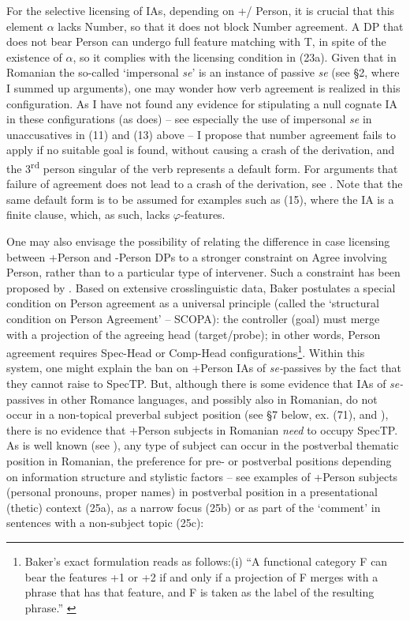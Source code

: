 \documentclass[output=paper]{langsci/langscibook}
\begin{document}
For the selective licensing of IAs, depending on +/\textminus{} Person, it is crucial that this element $\alpha $ lacks Number, so that it does not block Number agreement. A DP that does not bear Person can undergo full feature matching with T, in spite of the existence of $\alpha $, so it complies with the licensing condition in (23a). Given that in Romanian the so-called ‘impersonal \textit{se}’ is an instance of passive \textit{se} (see §2, where I summed up  arguments), one may wonder how verb agreement is realized in this configuration. As I have not found any evidence for stipulating a null cognate IA in these configurations (as \citealt{Dobrovie-Sorin1998} does) – see especially the use of impersonal \textit{se} in unaccusatives in (11) and (13) above – I propose that number agreement fails to apply if no suitable goal is found, without causing a crash of the derivation, and the 3\textsuperscript{rd} person singular of the verb represents a default form. For arguments that failure of agreement does not lead to a crash of the derivation, see \citet{Preminger2014}. Note that the same default form is to be assumed for examples such as (15), where the IA is a finite clause, which, as such, lacks $\varphi $-features.

One may also envisage the possibility of relating the difference in case licensing between +Person and -Person DPs to a stronger constraint on Agree involving Person, rather than to a particular type of intervener. Such a constraint has been proposed by \citet{Baker2008}. Based on extensive crosslinguistic data, Baker postulates a special condition on Person agreement as a universal principle (called the ‘structural condition on Person Agreement’ – SCOPA): the controller (goal) must merge with a projection of the agreeing head (target/probe); in other words, Person agreement requires Spec-Head or Comp-Head configurations\footnote{Baker’s exact formulation reads as follows:(i)  “A functional category F can bear the features +1 or +2 if and only if a projection of F merges with a phrase that has that feature, and F is taken as the label of the resulting phrase.” \citep[52]{Baker2008}}. Within this system, one might explain the ban on +Person IAs of \textit{se-}passives by the fact that they cannot raise to SpecTP. But, although there is some evidence that IAs of \textit{se-}passives in other Romance languages, and possibly also in Romanian, do not occur in a non-topical preverbal subject position (see §7 below, ex. (71), and \citealt{Raposo1996,Cornilescu1998,Dobrovie-Sorin2006}), there is no evidence that +Person subjects in Romanian \textit{need} to occupy SpecTP. As is well known (see \citealt{Dobrovie-Sorin1987,Dobrovie-Sorin1994,Cornilescu1997,Alboiu2002}), any type of subject can occur in the postverbal thematic position in Romanian, the preference for pre- or postverbal positions depending on information structure and stylistic factors – see examples of +Person subjects (personal pronouns, proper names) in postverbal position in a presentational (thetic) context (25a), as a narrow focus (25b) or as part of the ‘comment’ in sentences with a non-subject topic (25c):
\end{document}
